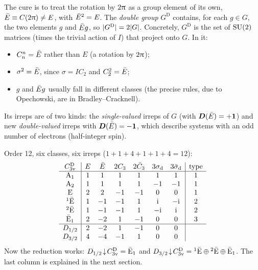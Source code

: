 The cure is to treat the rotation by $2\uppi$ as a group element of its own,
$\bar{E}\equiv C(2\uppi)\neq E$, with $\bar{E}^2=E$. The \emph{double group} $G^{\mathrm{D}}$
contains, for each $g\in G$, the two elements $g$ and $\bar{E} g$, so
$\lvert G^{\mathrm{D}}\rvert=2\lvert G\rvert$. Concretely, $G^{\mathrm{D}}$ is the set of $\mathrm{SU}(2)$
matrices (times the trivial action of $I$) that project onto $G$. In it:
\begin{itemize}
\item $C_n^n=\bar{E}$ rather than $E$ (a rotation by $2\uppi$);
\item $\sigma^2=\bar{E}$, since $\sigma=IC_2$ and $C_2^2=\bar{E}$;
\item $g$ and $\bar{E} g$ usually fall in different classes (the precise rules, due to
      Opechowski, are in Bradley--Cracknell).
\end{itemize}
Its irreps are of two kinds: the \emph{single-valued} irreps of $G$ (with
$\bm{D}(\bar{E})=+\bm{1}$) and new \emph{double-valued} irreps with $\bm{D}(\bar{E})=-\bm{1}$,
which describe systems with an odd number of electrons (half-integer spin).

\begin{example}
Order 12, six classes, six irreps ($1+1+4+1+1+4=12$):
\begin{equation}\label{eq:C3vdouble}
\begin{array}{c|cccccc|c}
C_{3\mathrm{v}}^{\mathrm{D}} & E & \bar{E} & 2C_3 & 2\bar{C}_3 & 3\sigma_{\mathrm{d}} & 3\bar{\sigma}_{\mathrm{d}} & \text{type}\\\hline
\mathrm{A}_1 & 1 & 1 & 1 & 1 & 1 & 1 & 1\\
\mathrm{A}_2 & 1 & 1 & 1 & 1 & -1 & -1 & 1\\
\mathrm{E} & 2 & 2 & -1 & -1 & 0 & 0 & 1\\
{}^{1}\bar{\mathrm{E}} & 1 & -1 & -1 & 1 & \mathrm{i} & -\mathrm{i} & 2\\
{}^{2}\bar{\mathrm{E}} & 1 & -1 & -1 & 1 & -\mathrm{i} & \mathrm{i} & 2\\
\bar{\mathrm{E}}_1 & 2 & -2 & 1 & -1 & 0 & 0 & 3\\\hline
D_{1/2} & 2 & -2 & 1 & -1 & 0 & 0 & \\
D_{3/2} & 4 & -4 & -1 & 1 & 0 & 0 &
\end{array}
\end{equation}
Now the reduction works:
$D_{1/2}\!\downarrow\!C_{3\mathrm{v}}^{\mathrm{D}}=\bar{\mathrm{E}}_1$ and
$D_{3/2}\!\downarrow\!C_{3\mathrm{v}}^{\mathrm{D}}={}^{1}\bar{\mathrm{E}}\oplus{}^{2}\bar{\mathrm{E}}\oplus\bar{\mathrm{E}}_1$.
The last column is explained in the next section.
\end{example}

